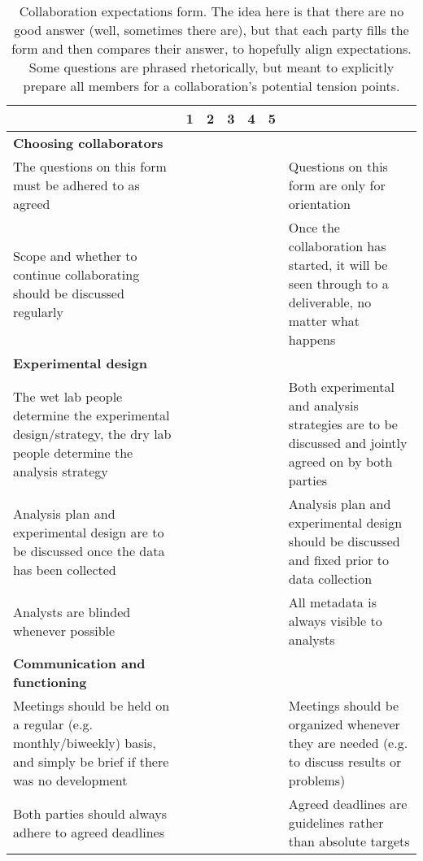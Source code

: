 \setlength\extrarowheight{4pt}

\begin{table}[!ht]
   \caption{Collaboration expectations form. The idea here is that there are no good answer (well, sometimes there are), but that each party fills the form and then compares their answer, to hopefully align expectations. Some questions are phrased rhetorically, but meant to explicitly prepare all members for a collaboration's potential tension points.}
    \label{form}
    \raggedleft
    \begin{adjustbox}{max width=\textwidth}
    \begin{tabular}{|p{3in}|l|l|l|l|l|p{3in}|}
    \hline
        ~ & 1 & 2 & 3 & 4 & 5 & ~ \tabularnewline \hline
        \textbf{Choosing collaborators} & ~ & ~ & ~ & ~ & ~ & ~ \tabularnewline \hline
        The questions on this form must be adhered to as agreed & ~ & ~ & ~ & ~ & ~ & Questions on this form are only for orientation \\ \hline
        Scope and whether to continue collaborating should be discussed regularly & ~ & ~ & ~ & ~ & ~ & Once the collaboration has started, it will be seen through to a deliverable, no matter what happens \\ \hline
        \textbf{Experimental design} & ~ & ~ & ~ & ~ & ~ & ~ \\ \hline
        The wet lab people determine the experimental design/strategy, the dry lab people determine the analysis strategy & ~ & ~ & ~ & ~ & ~ & Both experimental and analysis strategies are to be discussed and jointly agreed on by both parties \\ \hline
        Analysis plan and experimental design are to be discussed once the data has been collected & ~ & ~ & ~ & ~ & ~ & Analysis plan and experimental design should be discussed and fixed prior to data collection \\ \hline
        Analysts are blinded whenever possible & ~ & ~ & ~ & ~ & ~ & All metadata is always visible to analysts \\ \hline
        \textbf{Communication and functioning} & ~ & ~ & ~ & ~ & ~ & ~ \\ \hline
        Meetings should be held on a regular (e.g. monthly/biweekly) basis, and simply be brief if there was no development & ~ & ~ & ~ & ~ & ~ & Meetings should be organized whenever they are needed (e.g. to discuss results or problems) \\ \hline
        Both parties should always adhere to agreed deadlines & ~ & ~ & ~ & ~ & ~ & Agreed deadlines are guidelines rather than absolute targets \\ \hline

\end{tabular}
\end{adjustbox}
\end{table}
